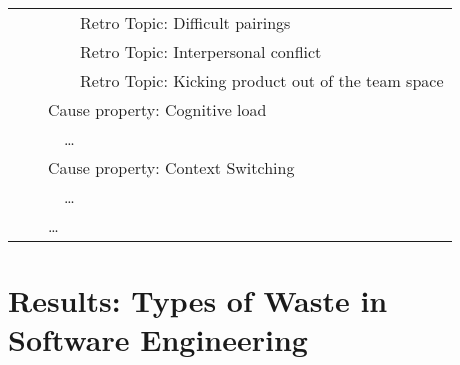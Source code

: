 \begin{table}[ht]
\begin{tabular}{|lllll|}
    &     &     &      & Retro Topic: Difficult pairings \\
    &     &     &      & Retro Topic: Interpersonal conflict \\
    &     &     &      & Retro Topic: Kicking product out of the team space \\
    &     & \multicolumn{3}{l|}{Cause property: Cognitive load}          \\
    &     &     & \multicolumn{2}{l|}{\dots} \\
    &     & \multicolumn{3}{l|}{Cause property: Context Switching}          \\
    &     &     & \multicolumn{2}{l|}{\dots} \\
    &     & \multicolumn{3}{l|}{\dots} \\
\hline
\end{tabular}
\end{table}



\section{Results: Types of Waste in Software Engineering}
\label{SEWaste}

